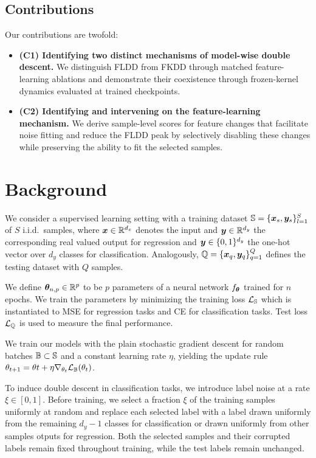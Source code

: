 \documentclass[10pt]{article} %
\newcommand{\batchloss}{\mathcal{L}_{\sB}}
\begin{document}
\subsection{Contributions}

Our contributions are twofold:

\begin{itemize}
    \item \textbf{(C1) Identifying two distinct mechanisms of model-wise double descent.} We distinguish FLDD from FKDD through matched feature-learning ablations and demonstrate their coexistence through frozen-kernel dynamics evaluated at trained checkpoints.

    \item \textbf{(C2) Identifying and intervening on the feature-learning mechanism.} We derive sample-level scores for feature changes that facilitate noise fitting and reduce the FLDD peak by selectively disabling these changes while preserving the ability to fit the selected samples.
\end{itemize}

\section{Background}

We consider a supervised learning setting with a training dataset ${\mathbb{S}} = \{{\bm{x}}_s, {\bm{y}}_s\}_{l=1}^{S}$ of $S$ i.i.d.\ samples, where ${\bm{x}} \in {\mathbb{R}}^{d_x}$ denotes the input and ${\bm{y}} \in {\mathbb{R}}^{d_y}$ the corresponding real valued output for regression and ${\bm{y}} \in \{0, 1\}^{d_y}$ the one-hot vector over $d_y$ classes for classification. Analogously, ${\mathbb{Q}} = \{{\bm{x}}_q, {\bm{y}}_q\}_{q=1}^{Q}$ defines the testing dataset with $Q$ samples.

We define ${\bm{\theta}}_{n,p} \in {\mathbb{R}}^{p}$ to be $p$ parameters of a neural network $f_{{\bm{\theta}}}$ trained for $n$ epochs. We train the parameters by minimizing the training loss $\mathcal{L}_{{\mathbb{S}}}$ which is instantiated to MSE for regression tasks and CE for classification tasks. Test loss $\mathcal{L}_{{\mathbb{Q}}}$ is used to measure the final performance.

We train our models with the plain stochastic gradient descent for random batches ${\mathbb{B}} \subset {\mathbb{S}}$ and a constant learning rate $\eta$, yielding the update rule $\theta_{t + 1} = \theta{t} + \eta \nabla_{\theta_t} \batchloss(\theta_t)$.

To induce double descent in classification tasks, we introduce label noise at a rate $\xi \in [0,1]$. Before training, we select a fraction $\xi$ of the training samples uniformly at random and replace each selected label with a label drawn uniformly from the remaining $d_y - 1$ classes for classification or drawn uniformly from other samples otputs for regression. Both the selected samples and their corrupted labels remain fixed throughout training, while the test labels remain unchanged.
\end{document}
